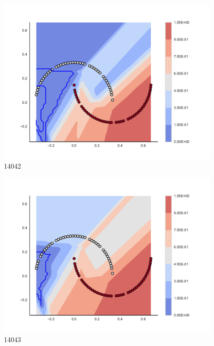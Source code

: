 \begin{subfigure}[b]{0.09\textwidth}
    \includegraphics[clip, trim=2.35cm 1.75cm 4.5cm 0cm,width=\textwidth]{img/convergence/14042.pdf}
    \caption{14042}
    \label{fig:convergence_14042}
\end{subfigure}
%
\begin{subfigure}[b]{0.09\textwidth}
    \includegraphics[clip, trim=2.35cm 1.75cm 4.5cm 0cm,width=\textwidth]{img/convergence/14043.pdf}
    \caption{14043}
    \label{fig:convergence_14043}
\end{subfigure}
%

